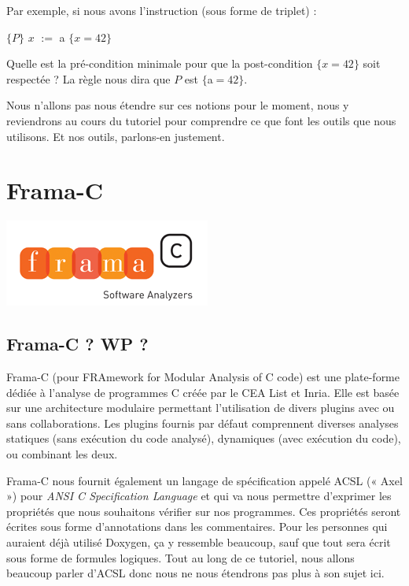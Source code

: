 \documentclass[12pt,francais,]{scrbook}
\begin{document}
Par exemple, si nous avons l'instruction (sous forme de triplet) :

\(\{P\}\) \(x\) \(:=\) a \(\{x = 42\}\)

Quelle est la pré-condition minimale pour que la post-condition
\(\{x = 42\}\) soit respectée ? La règle nous dira que \(P\) est
\(\{\)a\(=42\}\).

Nous n'allons pas nous étendre sur ces notions pour le moment, nous y
reviendrons au cours du tutoriel pour comprendre ce que font les outils
que nous utilisons. Et nos outils, parlons-en justement.

\section{Frama-C}\label{frama-c}

\begin{center}\includegraphics[scale=0.5]{framac.png}\end{center}

\subsection{Frama-C ? WP ?}\label{frama-c-wp}

Frama-C (pour FRAmework for Modular Analysis of C code) est une
plate-forme dédiée à l'analyse de programmes C créée par le CEA List et
Inria. Elle est basée sur une architecture modulaire permettant
l'utilisation de divers plugins avec ou sans collaborations. Les plugins
fournis par défaut comprennent diverses analyses statiques (sans
exécution du code analysé), dynamiques (avec exécution du code), ou
combinant les deux.

Frama-C nous fournit également un langage de spécification appelé ACSL
(« Axel ») pour \emph{ANSI C Specification Language} et qui va nous
permettre d'exprimer les propriétés que nous souhaitons vérifier sur nos
programmes. Ces propriétés seront écrites sous forme d'annotations dans
les commentaires. Pour les personnes qui auraient déjà utilisé Doxygen,
ça y ressemble beaucoup, sauf que tout sera écrit sous forme de formules
logiques. Tout au long de ce tutoriel, nous allons beaucoup parler
d'ACSL donc nous ne nous étendrons pas plus à son sujet ici.
\end{document}
